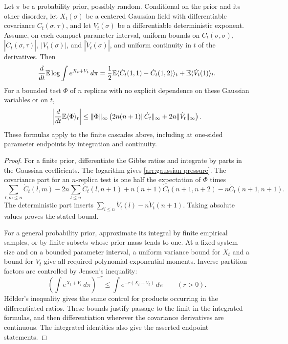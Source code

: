 \begin{lemma}\label{arr:gaussian-calculus}
Let $\pi$ be a probability prior, possibly random. Conditional on the
prior and its other disorder, let $X_t(\sigma)$ be a centered Gaussian
field with differentiable covariance $C_t(\sigma,\tau)$, and let
$V_t(\sigma)$ be a differentiable deterministic exponent. Assume, on
each compact parameter interval, uniform bounds on
$C_t(\sigma,\sigma)$, $|\dot C_t(\sigma,\tau)|$, $|V_t(\sigma)|$,
and $|\dot V_t(\sigma)|$, and uniform continuity in $t$ of the
derivatives. Then
\begin{equation}\label{arr:gaussian-pressure}
 \frac{d}{dt}\mathbb E\log\int e^{X_t+V_t}\,d\pi
 =\frac12\mathbb E\langle\dot C_t(1,1)-\dot C_t(1,2)\rangle_t
   +\mathbb E\langle\dot V_t(1)\rangle_t.
\end{equation}
For a bounded test $\Phi$ of $n$ replicas with no explicit dependence
on these Gaussian variables or on $t$,
\begin{equation}\label{arr:gaussian-test}
 \left|\frac{d}{dt}\mathbb E\langle\Phi\rangle_t\right|
 \leq\|\Phi\|_\infty
 \left(2n(n+1)\|\dot C_t\|_\infty
                    +2n\|\dot V_t\|_\infty\right).
\end{equation}
These formulas apply to the finite cascades above, including at
one-sided parameter endpoints by integration and continuity.
\end{lemma}

\begin{proof}
For a finite prior, differentiate the Gibbs ratios and integrate by
parts in the Gaussian coefficients. The logarithm gives
\eqref{arr:gaussian-pressure}. The covariance part for an $n$-replica
test is one half the expectation of $\Phi$ times
\[
 \sum_{l,m\leq n}\dot C_t(l,m)
 -2n\sum_{l\leq n}\dot C_t(l,n+1)
 +n(n+1)\dot C_t(n+1,n+2)
 -n\dot C_t(n+1,n+1).
\]
The deterministic part inserts
$\sum_{l\leq n}\dot V_t(l)-n\dot V_t(n+1)$.
Taking absolute values proves the stated bound.

For a general probability prior, approximate its integral by finite
empirical samples, or by finite subsets whose prior mass tends to one.
At a fixed system size and on a bounded parameter interval, a uniform
variance bound for $X_t$ and a bound for $V_t$ give all required
polynomial-exponential moments. Inverse partition factors are controlled
by Jensen's inequality:
\[
 \left(\int e^{X_t+V_t}\,d\pi\right)^{-r}
 \leq\int e^{-r(X_t+V_t)}\,d\pi\qquad(r>0).
\]
H\"older's inequality gives the same control for products occurring in
the differentiated ratios. These bounds justify passage to the limit
in the integrated formulas, and then differentiation wherever the
covariance derivatives are continuous. The integrated identities also
give the asserted endpoint statements.
\end{proof}
